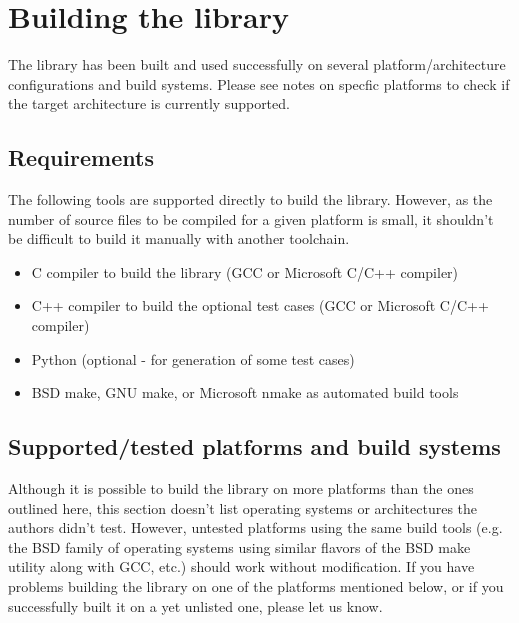 \newpage
\section{Building the library}

The library has been built and used successfully on several 
platform/architecture configurations and build systems.
Please see notes on specfic platforms to check if the target
architecture is currently supported.


\subsection{Requirements}

The following tools are supported directly to build the  library.
However, as the number of source files to be compiled for a given
platform is small, it shouldn't be difficult to build it manually with
another toolchain.
\begin{itemize}
\item C compiler to build the  library (GCC or Microsoft C/C++ compiler)
\item C++ compiler to build the optional test cases (GCC or Microsoft C/C++ compiler)
\item Python (optional - for generation of some test cases)
\item BSD make, GNU make, or Microsoft nmake as automated build tools
\end{itemize}


\subsection{Supported/tested platforms and build systems}

Although it is possible to build the  library on more platforms
than the ones outlined here, this section doesn't list operating systems or
architectures the authors didn't test. However, untested platforms using
the same build tools (e.g. the BSD family of operating systems using similar
flavors of the BSD make utility along with GCC, etc.) should work without
modification. If you have problems building the  library on one of the
platforms mentioned below, or if you successfully built it on a yet unlisted
one, please let us know.\\
\\

